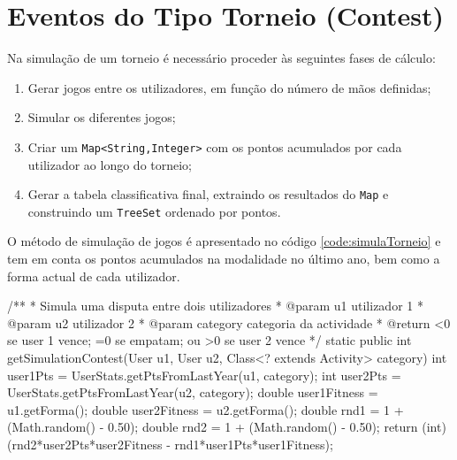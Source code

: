 \documentclass[a4paper,10pt]{report}
\begin{document}
\section{Eventos do Tipo Torneio (Contest)}
\label{sec:simulaTorneio}
Na simulação de um torneio é necessário proceder às seguintes fases de cálculo:
\begin{enumerate}
 \item Gerar jogos entre os utilizadores, em função do número de mãos definidas;
 \item Simular os diferentes jogos;
 \item Criar um \verb!Map<String,Integer>! com os pontos acumulados por cada utilizador ao longo do torneio;
 \item Gerar a tabela classificativa final, extraindo os resultados do \verb!Map! e construindo um \verb!TreeSet! ordenado por pontos.
\end{enumerate}
O método de simulação de jogos é apresentado no código \ref{code:simulaTorneio} e tem em conta os pontos acumulados na modalidade no último ano, 
bem como a forma actual de cada utilizador.

\begin{code}[caption=Métodos para a simulação de uma disputa entre dois utilizadores (src/core/EventSimulation.java)., label=code:simulaTorneio]
/**
* Simula uma disputa entre dois utilizadores
* @param u1 utilizador 1
* @param u2 utilizador 2
* @param category categoria da actividade
* @return <0 se user 1 vence; =0 se empatam; ou >0 se user 2 vence
*/
static public int getSimulationContest(User u1, User u2, Class<? extends Activity> category){
  int user1Pts = UserStats.getPtsFromLastYear(u1, category);
  int user2Pts = UserStats.getPtsFromLastYear(u2, category);
  double user1Fitness = u1.getForma();
  double user2Fitness = u2.getForma();
  double rnd1 = 1 + (Math.random() - 0.50);
  double rnd2 = 1 + (Math.random() - 0.50);
  return (int) (rnd2*user2Pts*user2Fitness - rnd1*user1Pts*user1Fitness);
}
\end{code}  

\newpage
\phantom{placeholder} %
\thispagestyle{empty} %
\newpage
\phantom{placeholder} %
\thispagestyle{empty} %
\end{document}
